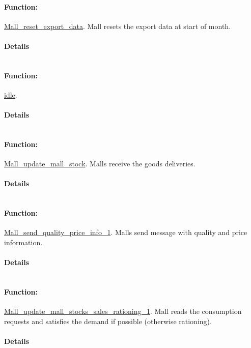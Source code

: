 \documentclass[a4paper,11pt]{article}
\begin{document}
\paragraph{Function:}\url{Mall_reset_export_data}.
Mall resets the export data at start of month.
\paragraph{Details}
\begin{verbatim}
\end{verbatim}
\paragraph{Function:}\url{idle}.

\paragraph{Details}
\begin{verbatim}
\end{verbatim}
\paragraph{Function:}\url{Mall_update_mall_stock}.
Malls receive the goods deliveries.
\paragraph{Details}
\begin{verbatim}
\end{verbatim}
\paragraph{Function:}\url{Mall_send_quality_price_info_1}.
Malls send message with quality and price information.
\paragraph{Details}
\begin{verbatim}
\end{verbatim}
\paragraph{Function:}\url{Mall_update_mall_stocks_sales_rationing_1}.
Mall reads the consumption requests and satisfies the demand 
if possible (otherwise rationing).
\paragraph{Details}
\begin{verbatim}
\end{verbatim}
\end{document}
